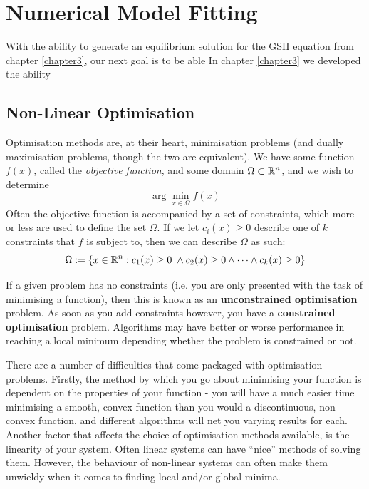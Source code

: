 
\chapter{Numerical Model Fitting}
\label{chapter4}

With the ability to generate an equilibrium solution for the GSH equation from chapter \ref{chapter3}, 
our next goal is to be able 
\todo
In chapter \ref{chapter3} we developed the ability 

\section{Non-Linear Optimisation}

Optimisation methods are, at their heart, minimisation problems (and dually maximisation problems, 
though the two are equivalent). We have some function $f(x)$, called the \textit{objective function},
and some domain $\Omega \subset \mathbb{R}^n$, and we wish to determine
$$\arg\min_{x \in \Omega} f(x)$$
Often the objective function is accompanied by a set of constraints, which more or 
less are used to define the set $\Omega$. If we let $c_i(x) \ge 0$ describe one of $k$ constraints that $f$ 
is subject to, then we can describe $\Omega$ as such:
$$\Omega := \lbrace x \in \mathbb{R}^n : c_1(x) \ge 0 \; \land c_2(x) \ge 0 \land \dots \land c_k(x) \ge 0 \rbrace$$

\begin{remark}
    If a given problem has no constraints (i.e. you are only presented with the task of minimising a function), then 
    this is known as an \textbf{unconstrained optimisation} problem. As soon as you add constraints however, you have a 
    \textbf{constrained optimisation} problem. Algorithms may have better or worse performance in reaching a local minimum 
    depending whether the problem is constrained or not.
\end{remark}

There are a number of difficulties that come packaged with optimisation problems. Firstly, 
the method by which you go about minimising your function is dependent on the properties of your function 
- you will have a much easier time minimising a smooth, convex function than you would a discontinuous, 
non-convex function, and different algorithms will net you varying results for each. Another factor 
that affects the choice of optimisation methods available, is the linearity of your system. Often linear systems 
can have ``nice'' methods of solving them. However, the behaviour of non-linear systems can often make them 
unwieldy when it comes to finding local and/or global minima. 


